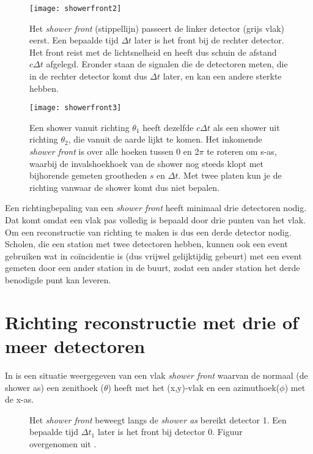 \begin{figure}
    \centering
    \texttt{[image: showerfront2]}
    \caption{Het \emph{shower front} (stippellijn) passeert de linker
             detector (grijs vlak) eerst. Een bepaalde tijd $\Delta t$
             later is het front bij de rechter detector. Het front reist
             met de lichtsnelheid en heeft dus schuin de afstand
             $c\Delta t$ afgelegd. Eronder staan de signalen die de
             detectoren meten, die in de rechter detector komt dus
             $\Delta t$ later, en kan een andere sterkte hebben.}
   \label{fig:showerfront2}
\end{figure}

\begin{figure}
    \centering
    \texttt{[image: showerfront3]}
    \caption{Een shower vanuit richting $\theta_1$ heeft dezelfde
             $c\Delta t$ als een shower uit richting $\theta_2$, die
             vanuit de aarde lijkt te komen. Het inkomende \emph{shower
             front} is over alle hoeken tussen 0 en 2$\pi$ te roteren om
             s-as, waarbij de invalshoekhoek van de shower nog steeds
             klopt met bijhorende gemeten grootheden $s$ en $\Delta t$.
             Met twee platen kun je de richting vanwaar de shower komt
             dus niet bepalen.}
   \label{fig:showerfront3}
\end{figure}

Een richtingbepaling van een \emph{shower front} heeft minimaal drie
detectoren nodig. Dat komt omdat een vlak pas volledig is bepaald door drie punten van het vlak. Om een reconstructie van
richting te maken is dus een derde detector nodig. Scholen, die een
station met twee detectoren hebben, kunnen ook een event gebruiken wat
in coïncidentie is (dus vrijwel gelijktijdig gebeurt) met een event gemeten door een ander station in de
buurt, zodat een ander station het derde benodigde punt kan leveren. 


\section{Richting reconstructie met drie of meer detectoren}

In  is een situatie weergegeven van een vlak
\emph{shower front} waarvan de normaal (de shower as) een zenithoek
($\theta$) heeft met het (x,y)-vlak en een azimuthoek($\phi$) met de
x-as.

\begin{figure}
    \centering
    
    \caption{Het \emph{shower front} beweegt langs de \emph{shower as}
             bereikt detector 1. Een bepaalde tijd $\Delta t_1$ later is
             het front bij detector 0. Figuur overgenomen uit
             \cite{Fokkema}.}
  \label{fig:frontthesis}
\end{figure}

